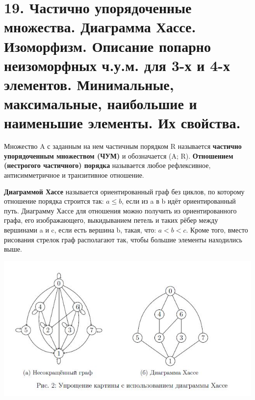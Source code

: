 \section*{19. Частично упорядоченные множества. Диаграмма Хассе. Изоморфизм. Описание попарно неизоморфных ч.у.м. для 3-х и 4-х элементов. Минимальные, максимальные, наибольшие и наименьшие элементы. Их свойства.}

Множество A с заданным на нем частичным порядком R называется \textbf{частично упорядоченным множеством (ЧУМ)} и обозначается (A; R). \textbf{Отношением (нестрогого частичного) порядка} называется любое рефлексивное, антисимметричное и транзитивное отношение. \\ \par

\textbf{Диаграммой Хассе} называется ориентированный граф без циклов, по которому отношение порядка строится так: $a \leqslant b$, если из a в b идёт ориентированный путь. Диаграмму Хассе для отношения можно получить из ориентированного графа, его изображающего, выкидыванием петель и таких рёбер между вершинами a и c, если есть вершина b, такая, что: $a < b < c$. Кроме того, вместо рисования стрелок граф располагают так, чтобы большие элементы находились выше. \par
\includegraphics{images/19_hasse} \par

